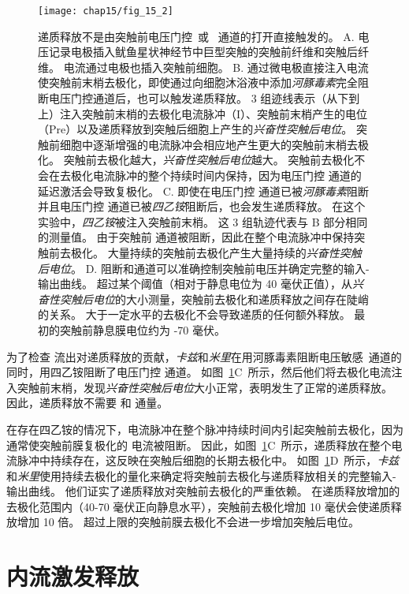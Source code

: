 \begin{figure}[htbp]
	\centering
	\texttt{[image: chap15/fig\_15\_2]}
	\caption{递质释放不是由突触前电压门控~或~ 通道的打开直接触发的\cite{katz1967study}。
	A. 电压记录电极插入鱿鱼星状神经节中巨型突触的突触前纤维和突触后纤维。
	电流通过电极也插入突触前细胞。
	B. 通过微电极直接注入电流使突触前末梢去极化，即使通过向细胞沐浴液中添加\textit{河豚毒素}完全阻断电压门控通道后，也可以触发递质释放。
	3 组迹线表示（从下到上）注入突触前末梢的去极化电流脉冲（I）、突触前末梢产生的电位（Pre）以及递质释放到突触后细胞上产生的\textit{兴奋性突触后电位}。
	突触前细胞中逐渐增强的电流脉冲会相应地产生更大的突触前末梢去极化。
	突触前去极化越大，\textit{兴奋性突触后电位}越大。
	突触前去极化不会在去极化电流脉冲的整个持续时间内保持，因为电压门控  通道的延迟激活会导致复极化。
	C. 即使在电压门控  通道已被\textit{河豚毒素}阻断并且电压门控  通道已被\textit{四乙铵}阻断后，也会发生递质释放。
	在这个实验中，\textit{四乙铵}被注入突触前末梢。
	这 3 组轨迹代表与 B 部分相同的测量值。
	由于突触前  通道被阻断，因此在整个电流脉冲中保持突触前去极化。
	大量持续的突触前去极化产生大量持续的\textit{兴奋性突触后电位}。
	D. 阻断和通道可以准确控制突触前电压并确定完整的输入-输出曲线。
	超过某个阈值（相对于静息电位为 40 毫伏正值），从\textit{兴奋性突触后电位}的大小测量，突触前去极化和递质释放之间存在陡峭的关系。
	大于一定水平的去极化不会导致递质的任何额外释放。
	最初的突触前静息膜电位约为 -70 毫伏。}
	\label{fig:15_2}
\end{figure}


为了检查  流出对递质释放的贡献，\textit{卡兹}和\textit{米里}在用河豚毒素阻断电压敏感~通道的同时，用四乙铵阻断了电压门控  通道。
如图~\ref{fig:15_2}C~所示，然后他们将去极化电流注入突触前末梢，发现\textit{兴奋性突触后电位}大小正常，表明发生了正常的递质释放。
因此，递质释放不需要  和  通量。


在存在四乙铵的情况下，电流脉冲在整个脉冲持续时间内引起突触前去极化，因为通常使突触前膜复极化的  电流被阻断。
因此，如图~\ref{fig:15_2}C~所示，递质释放在整个电流脉冲中持续存在，这反映在突触后细胞的长期去极化中。
如图~\ref{fig:15_2}D~所示，\textit{卡兹}和\textit{米里}使用持续去极化的量化来确定将突触前去极化与递质释放相关的完整输入-输出曲线。
他们证实了递质释放对突触前去极化的严重依赖。
在递质释放增加的去极化范围内（40-70 毫伏正向静息水平），突触前去极化增加 10 毫伏会使递质释放增加 10 倍。
超过上限的突触前膜去极化不会进一步增加突触后电位。



\section{ 内流激发释放}

